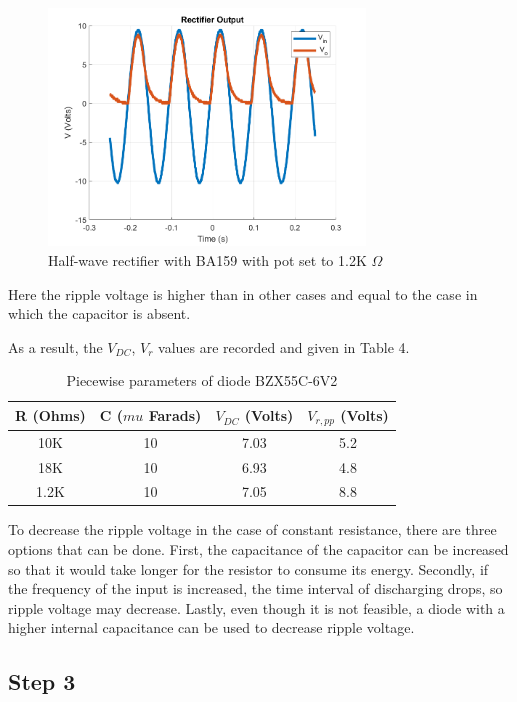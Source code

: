 \documentclass[letterpaper,12pt]{article}
\begin{document}
\begin{figure}[H]
    \centering
    \includegraphics[width = 0.75\textwidth]{2_b_POT_1_2K.png}
    \caption{Half-wave rectifier with BA159 with pot set to 1.2K \(\Omega\)}
\end{figure} 
Here the ripple voltage is higher than in other cases and equal to the case in which the capacitor is absent.

As a result, the \(V_{DC}\), \( V_r \) values are recorded and given in Table 4.

\begin{table}[H]
    \centering
    \caption{Piecewise parameters of diode BZX55C-6V2}
    \vspace{2mm}
    \begin{tabular}{||c | c | c | c||}
        \hline
    R (Ohms)& C (\(mu\) Farads) &\(V_{DC}\) (Volts) & \(V_{r , pp}\) (Volts) \\
    \hline
    10K & 10 & 7.03 & 5.2 \\
    \hline
    18K & 10 & 6.93 & 4.8 \\
    \hline
    1.2K & 10 & 7.05 & 8.8 \\
    \hline
    \end{tabular}
\end{table}
To decrease the ripple voltage in the case of constant resistance, there are three options that can be done. First, the capacitance of the capacitor can be increased so that it would take longer for the resistor to consume its energy. Secondly, if the frequency of the input is increased, the time interval of discharging drops, so ripple voltage may decrease. Lastly, even though it is not feasible, a diode with a higher internal capacitance can be used to decrease ripple voltage.

\subsection{Step 3}
\end{document}
